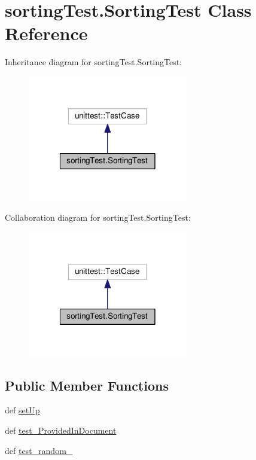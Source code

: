 \hypertarget{classsorting_test_1_1_sorting_test}{\section{sorting\-Test.\-Sorting\-Test Class Reference}
\label{classsorting_test_1_1_sorting_test}
}


Inheritance diagram for sorting\-Test.\-Sorting\-Test\-:
\nopagebreak
\begin{figure}[H]
\begin{center}
\leavevmode
\includegraphics[width=198pt]{classsorting_test_1_1_sorting_test__inherit__graph}
\end{center}
\end{figure}


Collaboration diagram for sorting\-Test.\-Sorting\-Test\-:
\nopagebreak
\begin{figure}[H]
\begin{center}
\leavevmode
\includegraphics[width=198pt]{classsorting_test_1_1_sorting_test__coll__graph}
\end{center}
\end{figure}
\subsection*{Public Member Functions}
\begin{DoxyCompactItemize}
\item 
def \hyperlink{classsorting_test_1_1_sorting_test_af6e2aa51c92f7fa5e53338621dc4bcf5}{set\-Up}
\item 
def \hyperlink{classsorting_test_1_1_sorting_test_a711be0994263a230f34937c31923c9b2}{test\-\_\-\-Provided\-In\-Document}
\item 
def \hyperlink{classsorting_test_1_1_sorting_test_a8ebad2ff4cd9b6a96a8a975e4578b12e}{test\-\_\-random\-\_}
\end{DoxyCompactItemize}
